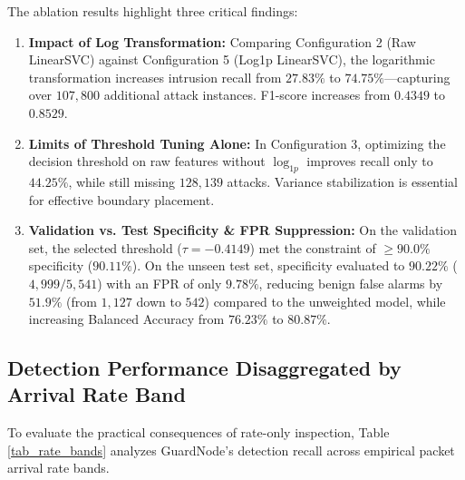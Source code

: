 \documentclass[conference]{IEEEtran}
\begin{document}
The ablation results highlight three critical findings:
\begin{enumerate}
    \item \textbf{Impact of Log Transformation:} Comparing Configuration 2 (Raw LinearSVC) against Configuration 5 (Log1p LinearSVC), the logarithmic transformation increases intrusion recall from $27.83\%$ to $74.75\%$---capturing over $107,800$ additional attack instances. F1-score increases from $0.4349$ to $0.8529$.
    \item \textbf{Limits of Threshold Tuning Alone:} In Configuration 3, optimizing the decision threshold on raw features without $\log_{1p}$ improves recall only to $44.25\%$, while still missing $128,139$ attacks. Variance stabilization is essential for effective boundary placement.
    \item \textbf{Validation vs. Test Specificity \& FPR Suppression:} On the validation set, the selected threshold ($\tau = -0.4149$) met the constraint of $\ge 90.0\%$ specificity ($90.11\%$). On the unseen test set, specificity evaluated to $90.22\%$ ($4,999 / 5,541$) with an FPR of only $9.78\%$, reducing benign false alarms by $51.9\%$ (from $1,127$ down to $542$) compared to the unweighted model, while increasing Balanced Accuracy from $76.23\%$ to $80.87\%$.
\end{enumerate}

\subsection{Detection Performance Disaggregated by Arrival Rate Band}
To evaluate the practical consequences of rate-only inspection, Table \ref{tab_rate_bands} analyzes GuardNode's detection recall across empirical packet arrival rate bands.
\end{document}
